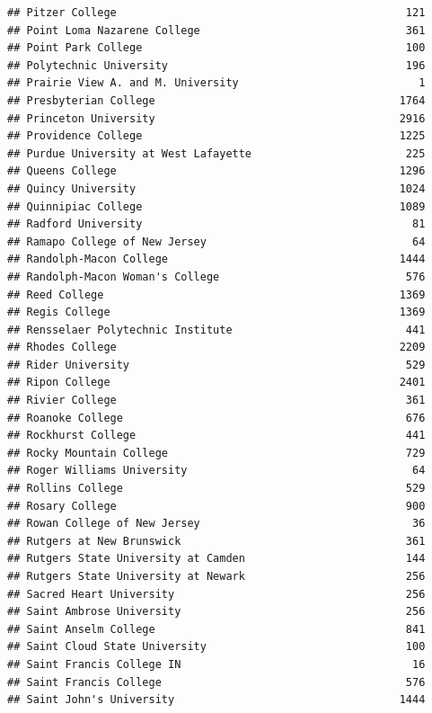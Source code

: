 \documentclass[
]{article}
\begin{document}
\begin{verbatim}
## Pitzer College                                             121
## Point Loma Nazarene College                                361
## Point Park College                                         100
## Polytechnic University                                     196
## Prairie View A. and M. University                            1
## Presbyterian College                                      1764
## Princeton University                                      2916
## Providence College                                        1225
## Purdue University at West Lafayette                        225
## Queens College                                            1296
## Quincy University                                         1024
## Quinnipiac College                                        1089
## Radford University                                          81
## Ramapo College of New Jersey                                64
## Randolph-Macon College                                    1444
## Randolph-Macon Woman's College                             576
## Reed College                                              1369
## Regis College                                             1369
## Rensselaer Polytechnic Institute                           441
## Rhodes College                                            2209
## Rider University                                           529
## Ripon College                                             2401
## Rivier College                                             361
## Roanoke College                                            676
## Rockhurst College                                          441
## Rocky Mountain College                                     729
## Roger Williams University                                   64
## Rollins College                                            529
## Rosary College                                             900
## Rowan College of New Jersey                                 36
## Rutgers at New Brunswick                                   361
## Rutgers State University at Camden                         144
## Rutgers State University at Newark                         256
## Sacred Heart University                                    256
## Saint Ambrose University                                   256
## Saint Anselm College                                       841
## Saint Cloud State University                               100
## Saint Francis College IN                                    16
## Saint Francis College                                      576
## Saint John's University                                   1444

\end{verbatim}
\end{document}
